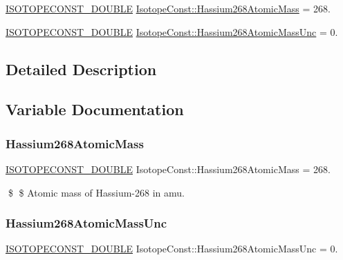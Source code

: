 \begin{DoxyCompactItemize}
\item 
\mbox{\hyperlink{group___isotope_const-_macros_ga8f45a7272ce02c0b4c65c44636ed719a}{I\+S\+O\+T\+O\+P\+E\+C\+O\+N\+S\+T\+\_\+\+D\+O\+U\+B\+LE}} \mbox{\hyperlink{group___isotope_const-_hassium-_hs268_ga5f8b5341339a6e30581c07ae66afd306}{Isotope\+Const\+::\+Hassium268\+Atomic\+Mass}} = 268.
\item 
\mbox{\hyperlink{group___isotope_const-_macros_ga8f45a7272ce02c0b4c65c44636ed719a}{I\+S\+O\+T\+O\+P\+E\+C\+O\+N\+S\+T\+\_\+\+D\+O\+U\+B\+LE}} \mbox{\hyperlink{group___isotope_const-_hassium-_hs268_gabf43c04971e6c2746dc4fe3128d374fd}{Isotope\+Const\+::\+Hassium268\+Atomic\+Mass\+Unc}} = 0.
\end{DoxyCompactItemize}


\subsection{Detailed Description}


\subsection{Variable Documentation}
\mbox{\label{group___isotope_const-_hassium-_hs268_ga5f8b5341339a6e30581c07ae66afd306}} 
\subsubsection{\texorpdfstring{Hassium268\+Atomic\+Mass}{Hassium268AtomicMass}}
{\footnotesize\ttfamily \mbox{\hyperlink{group___isotope_const-_macros_ga8f45a7272ce02c0b4c65c44636ed719a}{I\+S\+O\+T\+O\+P\+E\+C\+O\+N\+S\+T\+\_\+\+D\+O\+U\+B\+LE}} Isotope\+Const\+::\+Hassium268\+Atomic\+Mass = 268.}

\$ \$ Atomic mass of Hassium-\/268 in amu. \mbox{\label{group___isotope_const-_hassium-_hs268_gabf43c04971e6c2746dc4fe3128d374fd}} 
\subsubsection{\texorpdfstring{Hassium268\+Atomic\+Mass\+Unc}{Hassium268AtomicMassUnc}}
{\footnotesize\ttfamily \mbox{\hyperlink{group___isotope_const-_macros_ga8f45a7272ce02c0b4c65c44636ed719a}{I\+S\+O\+T\+O\+P\+E\+C\+O\+N\+S\+T\+\_\+\+D\+O\+U\+B\+LE}} Isotope\+Const\+::\+Hassium268\+Atomic\+Mass\+Unc = 0.}


